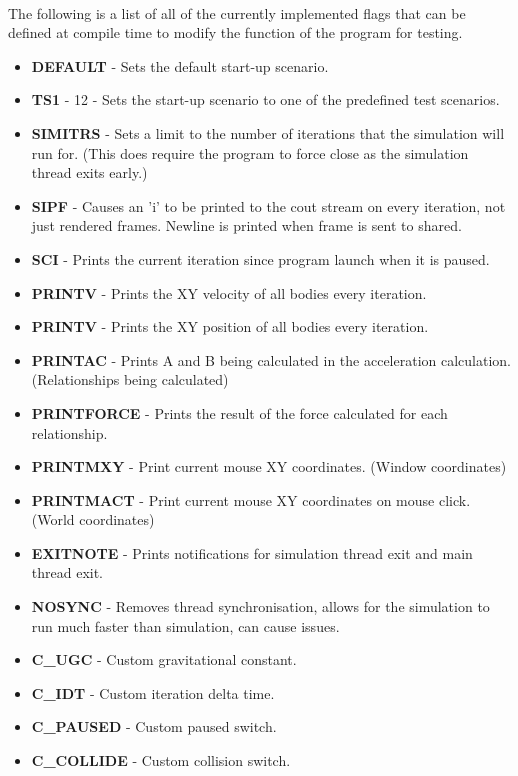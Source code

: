 \paragraph{}
The following is a list of all of the currently implemented flags that can be defined at compile time to modify the function of the program for testing.\\
\begin{itemize}
\footnotesize
\item \textbf{DEFAULT} - Sets the default start-up scenario.
\item \textbf{TS1} - 12 - Sets the start-up scenario to one of the predefined test scenarios.
\item \textbf{SIMITRS} - Sets a limit to the number of iterations that the simulation will run for. (This does require the program to force close as the simulation thread exits early.)
\item \textbf{SIPF} - Causes an 'i' to be printed to the cout stream on every iteration, not just rendered frames. Newline is printed when frame is sent to shared.
\item \textbf{SCI} - Prints the current iteration since program launch when it is paused.
\item \textbf{PRINTV} - Prints the XY velocity of all bodies every iteration.
\item \textbf{PRINTV} - Prints the XY position of all bodies every iteration.
\item \textbf{PRINTAC} - Prints A and B being calculated in the acceleration calculation. (Relationships being calculated)
\item \textbf{PRINTFORCE} - Prints the result of the force calculated for each relationship. 
\item \textbf{PRINTMXY} - Print current mouse XY coordinates. (Window coordinates)
\item \textbf{PRINTMACT} - Print current mouse XY coordinates on mouse click. (World coordinates)
\item \textbf{EXITNOTE} - Prints notifications for simulation thread exit and main thread exit.
\item \textbf{NOSYNC} - Removes thread synchronisation, allows for the simulation to run much faster than simulation, can cause issues.
\item \textbf{C\_UGC} - Custom gravitational constant.
\item \textbf{C\_IDT} - Custom iteration delta time.
\item \textbf{C\_PAUSED} - Custom paused switch.
\item \textbf{C\_COLLIDE} - Custom collision switch.
\end{itemize}